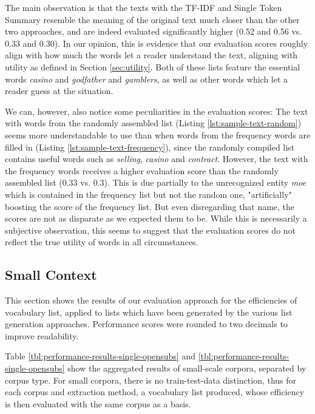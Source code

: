 

The main observation is that the texts with the TF-IDF and Single Token Summary resemble the meaning of the original text much closer than the other two approaches, and are indeed evaluated significantly higher (0.52 and 0.56 vs. 0.33 and 0.30).
In our opinion, this is evidence that our evaluation scores roughly align with how much the words let a reader understand the text, aligning with utility as defined in Section \ref{sec:utility}.
Both of these lists feature the essential words \textit{casino} and \textit{godfather} and \textit{gamblers}, as well as other words which let a reader guess at the situation.

We can, however, also notice some peculiarities in the evaluation scores:
The text with words from the randomly assembled list (Listing \ref{lst:sample-text-random}) seems more understandable to use than when words from the  frequency words are filled in (Listing \ref{lst:sample-text-frequency}), since the randomly compiled list contains useful words such as \textit{selling}, \textit{casino} and \textit{contract}.
However, the text with the frequency words receives a higher evaluation score than the randomly assembled list (0.33 vs. 0.3).
This is due partially to the unrecognized entity \textit{moe} which is contained in the frequency list but not the random one, "artificially" boosting the score of the frequency list.
But even disregarding that name, the scores are not as disparate as we expected them to be.
While this is necessarily a subjective observation, this seems to suggest that the evaluation scores do not reflect the true utility of words in all circumstances.



\subsection{Small Context} \label{sec:results-small-context}

This section shows the results of our evaluation approach for the efficiencies of vocabulary list, applied to lists which have been generated by the various list generation approaches.
Performance scores were rounded to two decimals to improve readability.


Table \ref{tbl:performance-results-single-opensubs} and \ref{tbl:performance-results-single-opensubs} show the aggregated results of small-scale corpora, separated by corpus type.
For small corpora, there is no train-test-data distinction, thus for each corpus and extraction method, a vocabulary list produced, whose efficiency is then evaluated with the same corpus as a basis.
%
% 	

